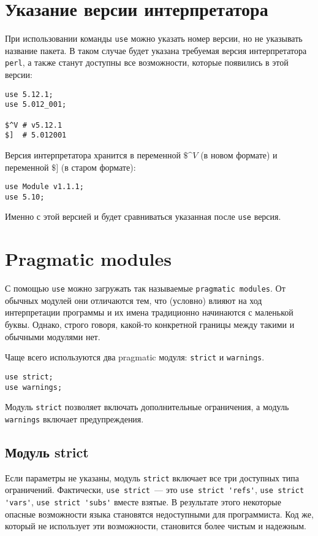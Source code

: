 \section{Указание версии интерпретатора}
При использовании команды \verb|use| можно указать номер версии, но не указывать название пакета. В таком случае будет указана требуемая версия интерпретатора \verb|perl|, а также станут доступны все возможности, которые появились в этой версии:
\begin{verbatim}
use 5.12.1;
use 5.012_001;

$^V # v5.12.1
$]  # 5.012001
\end{verbatim}
Версия интерпретатора хранится в переменной $\$\^V$ (в новом формате) и переменной $\$]$ (в старом формате):
\begin{verbatim}
use Module v1.1.1;
use 5.10;
\end{verbatim}
Именно с этой версией и будет сравниваться указанная после \verb|use| версия.

\section{Pragmatic modules} %
С помощью \verb|use| можно загружать так называемые \verb|pragmatic modules|. От обычных модулей они отличаются тем, что (условно) влияют на ход интерпретации программы и их имена традиционно начинаются с маленькой буквы. Однако, строго говоря, какой-то конкретной границы между такими и обычными модулями нет.

Чаще всего используются два pragmatic модуля: \verb|strict| и \verb|warnings|.
\begin{verbatim}
use strict;
use warnings;
\end{verbatim}
Модуль \verb|strict| позволяет включать дополнительные ограничения, а модуль \verb|warnings| включает предупреждения.

\subsection{Модуль strict} %
Если параметры не указаны, модуль \verb|strict| включает все три доступных типа ограничений. Фактически, \verb|use strict|~--- это \verb|use strict 'refs'|, \verb|use strict 'vars'|, \verb|use strict 'subs'| вместе взятые. В результате этого некоторые опасные возможности языка становятся недоступными для программиста. Код же, который не использует эти возможности, становится более чистым и надежным.

